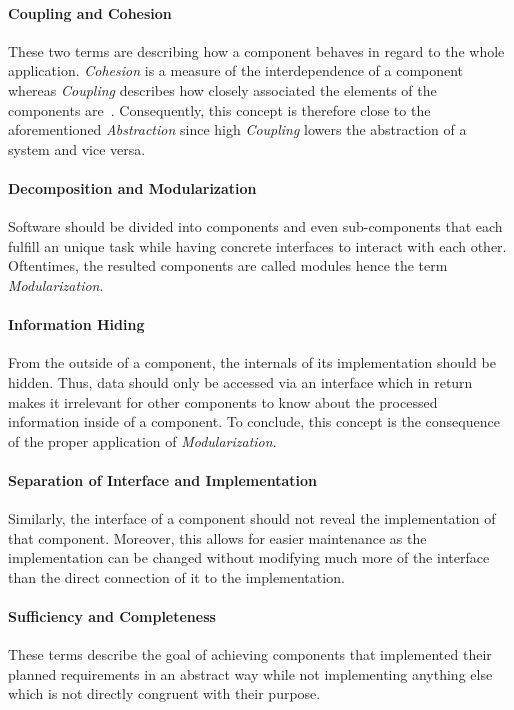 \documentclass[12pt,a4paper,twoside]{report}
\begin{document}
\paragraph{Coupling and Cohesion}
These two terms are describing how a component behaves in regard to the whole application.
\textit{Cohesion} is a measure of the interdependence of a component whereas
\textit{Coupling} describes how closely associated the elements of the
components are~\cite{mcconnell-code-complete, swebok}.
Consequently, this concept is therefore close to the aforementioned \textit{Abstraction}
since high \textit{Coupling} lowers the abstraction of a system and vice versa.

\paragraph{Decomposition and Modularization}
Software should be divided into components and even sub-components that each fulfill
an unique task while having concrete interfaces to interact with each other.
Oftentimes, the resulted components are called modules hence the term \textit{Modularization}.

\paragraph{Information Hiding}
From the outside of a component, the internals of its implementation should be hidden.
Thus, data should only be accessed via an interface which in return makes it irrelevant
for other components to know about the processed information inside of a component.
To conclude, this concept is the consequence of the proper application of \textit{Modularization}.

\paragraph{Separation of Interface and Implementation}
Similarly, the interface of a component should not reveal the implementation of
that component. Moreover, this allows for easier maintenance as the implementation
can be changed without modifying much more of the interface than the direct connection
of it to the implementation.

\paragraph{Sufficiency and Completeness}
These terms describe the goal of achieving components that implemented their
planned requirements in an abstract way while not implementing anything else
which is not directly congruent with their purpose.
\end{document}
